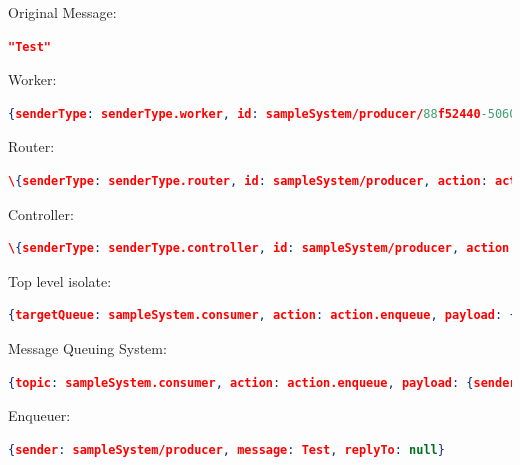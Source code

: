 \begin{description}

\item Original Message:
\begin{lstlisting}[language=json,numbers=none]
"Test"
\end{lstlisting}

\item Worker:
\begin{lstlisting}[language=json,numbers=none]
{senderType: senderType.worker, id: sampleSystem/producer/88f52440-5060-11e4-f396-97cebb949945, action: action.send, payload: {sender: sampleSystem/producer, to: sampleSystem/consumer, message: Test, replyTo: null}}
\end{lstlisting}

\item Router:
\begin{lstlisting}[language=json,numbers=none]
\{senderType: senderType.router, id: sampleSystem/producer, action: action.send, payload: \{sender: sampleSystem/producer, to: sampleSystem/consumer, message: Test, replyTo: null\}\}
\end{lstlisting}

\item Controller:
\begin{lstlisting}[language=json,numbers=none]
\{senderType: senderType.controller, id: sampleSystem/producer, action: action.send, payload: \{sender: sampleSystem/producer, to: sampleSystem/consumer, message: Test, replyTo: null\}\}
\end{lstlisting}

\item Top level isolate:
\begin{lstlisting}[language=json,numbers=none]
{targetQueue: sampleSystem.consumer, action: action.enqueue, payload: {sender: sampleSystem/producer, message: Test, replyTo: null}}
\end{lstlisting}

\item Message Queuing System:
\begin{lstlisting}[language=json,numbers=none]
{topic: sampleSystem.consumer, action: action.enqueue, payload: {sender: sampleSystem/producer, message: Test, replyTo: null}}
\end{lstlisting}

\item Enqueuer:
\begin{lstlisting}[language=json,numbers=none]
  {sender: sampleSystem/producer, message: Test, replyTo: null}
\end{lstlisting}
\end{description}

